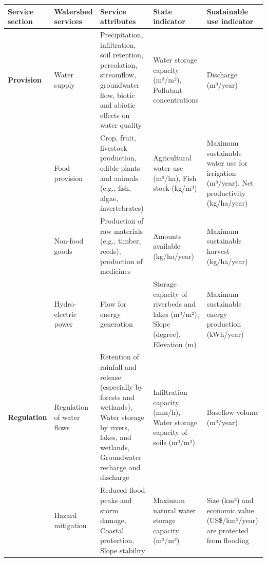 \documentclass[./main.tex]{subfiles}
\begin{document}
{\renewcommand{\arraystretch}{1.5}
\begin{table}[t!]
    \centering	
    \tiny
    \sffamily
    \begin{tabular}{ 
        >{\raggedright\arraybackslash}m{1.5cm} 
        >{\raggedright\arraybackslash}m{2.5cm}  
        >{\raggedright\arraybackslash}m{3.0cm}  
        >{\raggedright\arraybackslash}m{2.5cm}
        >{\raggedright\arraybackslash}m{2.5cm}
    }
    \toprule 
    \textbf{Service section} & \textbf{Watershed services} & \textbf{Service attributes} & \textbf{State indicator} & \textbf{Sustainable use indicator} \\ 
    \midrule 
    \textbf{Provision} & Water supply & Precipitation, infiltration, soil retention, percolation, streamflow, groundwater flow, biotic and abiotic effects on water quality & Water storage capacity (m³/m²), Pollutant concentrations & Discharge (m³/year) \\ 
    
    \cline{2-5} 
     & Food provision & Crop, fruit, livestock production, edible plants and animals (e.g., fish, algae, invertebrates) & Agricultural water use (m³/ha), Fish stock (kg/m³) & Maximum sustainable water use for irrigation (m³/year), Net productivity (kg/ha/year) \\ 
    
    \cline{2-5}
     & Non-food goods & Production of raw materials (e.g., timber, reeds), production of medicines & Amounts available (kg/ha/year) & Maximum sustainable harvest (kg/ha/year) \\ 
    
    \cline{2-5} & Hydro-electric power & Flow for energy generation & Storage capacity of riverbeds and lakes (m³/m²), Slope (degree), Elevation (m) & Maximum sustainable energy production (kWh/year) \\ 
    
    \textbf{Regulation} & Regulation of water flows & Retention of rainfall and release (especially by forests and wetlands), Water storage by rivers, lakes, and wetlands, Groundwater recharge and discharge & Infiltration capacity (mm/h), Water storage capacity of soils (m³/m²) & Baseflow volume (m³/year) \\ 
    
    \cline{2-5}
    & Hazard mitigation & Reduced flood peaks and storm damage, Coastal protection, Slope stability & Maximum natural water storage capacity (m³/m²) & Size (km²) and economic value (US\$/km²/year) are protected from flooding \\ 
    

\end{tabular}
\end{table}}
\end{document}
